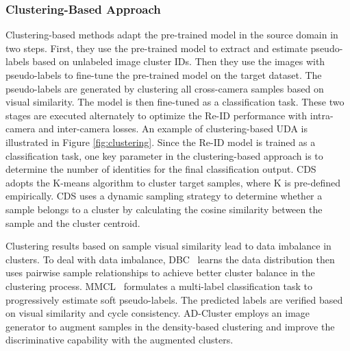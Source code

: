 \documentclass[a4paper,fleqn]{cas-dc}
\begin{document}
\subsubsection{Clustering-Based Approach}

Clustering-based methods adapt the pre-trained model in the source domain in two steps. First, they use the pre-trained model to extract and estimate pseudo-labels based on unlabeled image cluster IDs. Then they use the images with pseudo-labels to fine-tune the pre-trained model on the target dataset. The pseudo-labels are generated by clustering all cross-camera samples based on visual similarity. The model is then fine-tuned as a classification task. These two stages are executed alternately to optimize the Re-ID performance with intra-camera and inter-camera losses. An example of clustering-based UDA is illustrated in Figure \ref{fig:clustering}. Since the Re-ID model is trained as a classification task, one key parameter in the clustering-based approach is to determine the number of identities for the final classification output. CDS~\cite{wu_clustering_2019} adopts the K-means algorithm to cluster target samples, where K is pre-defined empirically. CDS uses a dynamic sampling strategy to determine whether a sample belongs to a cluster by calculating the cosine similarity between the sample and the cluster centroid. 

Clustering results based on sample visual similarity lead to data imbalance in clusters. To deal with data imbalance, DBC~\cite{ding_towards_2019} learns the data distribution then uses pairwise sample relationships to achieve better cluster balance in the clustering process. MMCL~\cite{wang_unsupervised_2020} formulates a multi-label classification task to progressively estimate soft pseudo-labels. The predicted labels are verified based on visual similarity and cycle consistency. AD-Cluster\cite{zhai_ad-cluster_2020} employs an image generator to augment samples in the density-based clustering and improve the discriminative capability with the augmented clusters.
\end{document}
